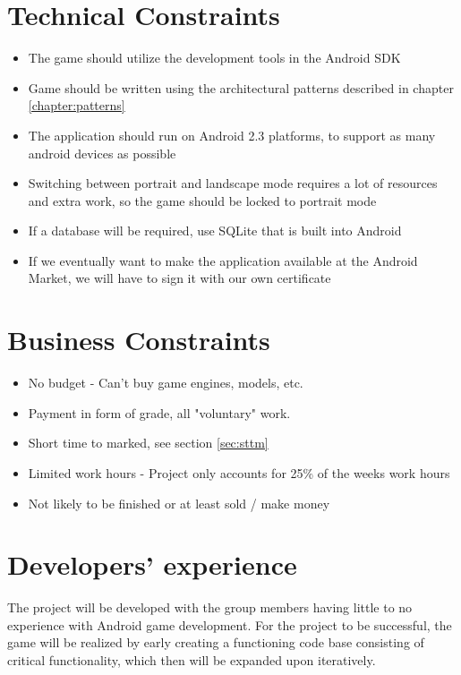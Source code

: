	\section{Technical Constraints}
		\begin{itemize}
			\item The game should utilize the development tools in the Android SDK
			\item Game should be written using the architectural patterns described in chapter \ref{chapter:patterns}
			\item The application should run on Android 2.3 platforms, to support as many android devices as possible
			\item Switching between portrait and landscape mode requires a lot of resources and extra work, so the game should be locked to portrait mode
			\item If a database will be required, use SQLite that is built into Android
			\item If we eventually want to make the application available at the Android Market, we will have to sign it with our own certificate
		\end{itemize}

	\section{Business Constraints}
		\begin{itemize}
			\item No budget - Can't buy game engines, models, etc.
			\item Payment in form of grade, all "voluntary" work.
			\item Short time to marked, see section \ref{sec:sttm}
			\item Limited work hours - Project only accounts for 25\% of the weeks work hours
			\item Not likely to be finished or at least sold / make money
		\end{itemize}


	\section{Developers' experience}
	The project will be developed with the group members having little to no experience with Android game development. For the project to be successful, the game will be realized by early creating a functioning code base consisting of critical functionality, which then will be expanded upon iteratively.

